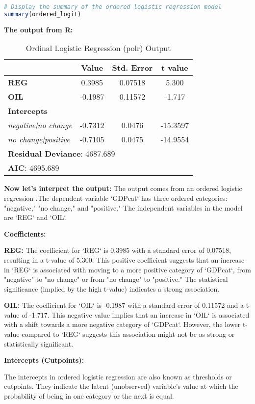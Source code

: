 \documentclass[12pt,letterpaper]{article}
\begin{document}
\begin{enumerate}
\begin{lstlisting}[language=R]
# Display the summary of the ordered logistic regression model
summary(ordered_logit)
\end{lstlisting}
\textbf{The output from R:}
\begin{table}[ht]
\centering
\caption{Ordinal Logistic Regression (polr) Output}
\begin{tabular}{lccc}
\toprule
& \textbf{Value} & \textbf{Std. Error} & \textbf{t value} \\
\midrule
\textbf{REG} & 0.3985 & 0.07518 & 5.300 \\
\textbf{OIL} & -0.1987 & 0.11572 & -1.717 \\
\midrule
\multicolumn{4}{l}{\textbf{Intercepts}} \\
\textit{negative|no change} & -0.7312 & 0.0476 & -15.3597 \\
\textit{no change|positive} & -0.7105 & 0.0475 & -14.9554 \\
\midrule
\multicolumn{4}{l}{\textbf{Residual Deviance}: 4687.689} \\
\multicolumn{4}{l}{\textbf{AIC}: 4695.689} \\
\bottomrule
\end{tabular}
\end{table}
\newpage
\textbf{Now let's interpret the output:}
The output comes from an ordered logistic regression .The dependent variable `GDPcat` has three ordered categories: "negative," "no change," and "positive." The independent variables in the model are `REG` and `OIL`. 

\textbf{Coefficients:}

\textbf{REG: }The coefficient for `REG` is 0.3985 with a standard error of 0.07518, resulting in a t-value of 5.300. This positive coefficient suggests that an increase in `REG` is associated with moving to a more positive category of `GDPcat`, from "negative" to "no change" or from "no change" to "positive." The statistical significance (implied by the high t-value) indicates a strong association.

\textbf{OIL: }The coefficient for `OIL` is -0.1987 with a standard error of 0.11572 and a t-value of -1.717. This negative value implies that an increase in `OIL` is associated with a shift towards a more negative category of `GDPcat`. However, the lower t-value compared to `REG` suggests this association might not be as strong or statistically significant.

\textbf{Intercepts (Cutpoints):}

The intercepts in ordered logistic regression are also known as thresholds or cutpoints. They indicate the latent (unobserved) variable's value at which the probability of being in one category or the next is equal.


\end{enumerate}
\end{document}
